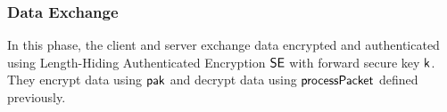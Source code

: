 \subsubsection{Data Exchange}
In this phase, the client and server exchange data
encrypted and authenticated using Length-Hiding
Authenticated Encryption $\mathsf{SE}$ with forward secure key
$\mathsf{k}$.
They encrypt data using $\mathsf{pak}$ and decrypt data using
$\mathsf{processPacket}$ defined previously.